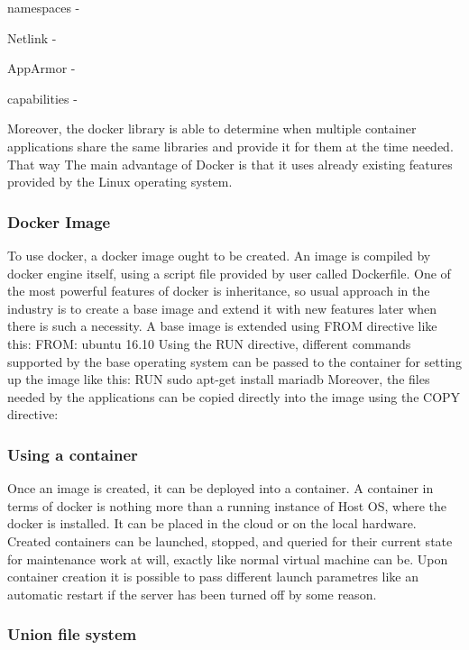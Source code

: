 namespaces -

Netlink -

AppArmor -

capabilities -

Moreover, the docker library is able to determine when multiple container
applications share the same libraries
and provide it for them at the time needed.
That way
The main advantage of Docker is that it uses already existing features
provided by the Linux operating system.

\subsubsection{Docker Image}

To use docker, a docker image ought to be created.
An image is compiled by docker engine itself,
using a script file provided by user called Dockerfile.
One of the most powerful features of docker is inheritance,
 so usual approach in the industry
is to create a base image and extend it with
new features later when there is such a necessity.
A base image is extended using FROM directive like this:
FROM: ubuntu 16.10
Using the RUN directive, different commands supported by the base operating
system can be passed to the container for setting up the image like this:
RUN sudo apt-get install mariadb
Moreover, the files needed by the applications can be copied directly
into the image using the COPY directive:

\subsubsection{Using a container}

Once an image is created, it can be deployed into a container. A
container in terms of docker is nothing more than a running
instance of Host OS, where the docker is installed. It can be placed
in the cloud or on the local hardware.
Created containers can be launched, stopped, and queried for their
current state for maintenance work at will, exactly like normal virtual
machine can be. Upon container creation it is possible to pass
different launch parametres like an automatic restart if the server
has been turned off by some reason.

\subsubsection{Union file system}

